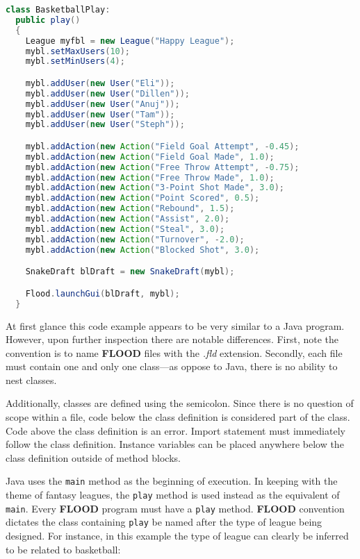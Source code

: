 \documentclass[12pt]{report}
\begin{document}
\begin{singlespace}
\begin{lstlisting}[language=Java,label=some-code,caption=BasketballPlay.fld]
class BasketballPlay:
  public play()
  {
    League myfbl = new League("Happy League");
    mybl.setMaxUsers(10);
    mybl.setMinUsers(4);

    mybl.addUser(new User("Eli"));
    mybl.addUser(new User("Dillen"));
    mybl.addUser(new User("Anuj"));
    mybl.addUser(new User("Tam"));
    mybl.addUser(new User("Steph"));

    mybl.addAction(new Action("Field Goal Attempt", -0.45);
    mybl.addAction(new Action("Field Goal Made", 1.0);
    mybl.addAction(new Action("Free Throw Attempt", -0.75);
    mybl.addAction(new Action("Free Throw Made", 1.0);
    mybl.addAction(new Action("3-Point Shot Made", 3.0);
    mybl.addAction(new Action("Point Scored", 0.5);
    mybl.addAction(new Action("Rebound", 1.5);
    mybl.addAction(new Action("Assist", 2.0);
    mybl.addAction(new Action("Steal", 3.0);
    mybl.addAction(new Action("Turnover", -2.0);
    mybl.addAction(new Action("Blocked Shot", 3.0);

    SnakeDraft blDraft = new SnakeDraft(mybl);

    Flood.launchGui(blDraft, mybl);
  }
\end{lstlisting}
\end{singlespace}

At first glance this code example appears to be very similar to a Java program. However, upon further inspection there are notable differences. First, note the convention is to name \textbf{FLOOD} files with the \textit{.fld} extension. Secondly, each file must contain one and only one class---as oppose to Java, there is no ability to nest classes.

Additionally, classes are defined using the semicolon. Since there is no question of scope within a file, code below the class definition is considered part of the class. Code above the class definition is an error. Import statement must immediately follow the class definition. Instance variables can be placed anywhere below the class definition outside of method blocks.

Java uses the \texttt{main} method as the beginning of execution. In keeping with the theme of fantasy leagues, the \texttt{play} method is used instead as the equivalent of \texttt{main}. Every \textbf{FLOOD} program must have a \texttt{play} method. \textbf{FLOOD} convention dictates the class containing \texttt{play} be named after the type of league being designed. For instance, in this example the type of league can clearly be inferred to be related to basketball:
\end{document}
